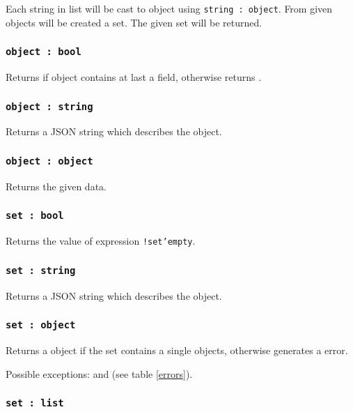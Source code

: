 Each string in list will be cast to object using \texttt{string : object}. From given objects will be created a set. The given set will be returned.

\subsubsection{\texttt{object : bool}}

Returns \true{} if object contains at last a field, otherwise returns \false.

\subsubsection{\texttt{object : string}}

Returns a JSON string which describes the object.

\subsubsection{\texttt{object : object}}

Returns the given data.

\subsubsection{\texttt{set : bool}}

Returns the value of expression \texttt{!set'empty}.

\subsubsection{\texttt{set : string}}

Returns a JSON string which describes the object.

\subsubsection{\texttt{set : object}}

Returns a object if the set contains a single objects, otherwise generates a error.

Possible exceptions:  and  (see table \ref{errors}).

\subsubsection{\texttt{set : list}}

